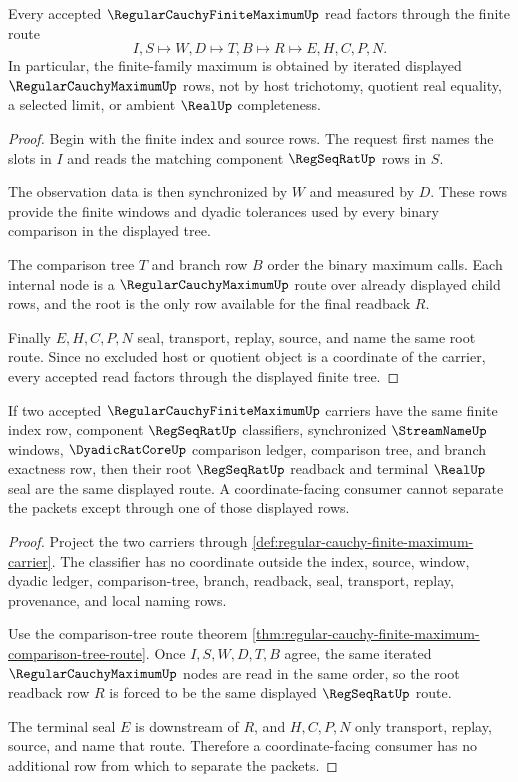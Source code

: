 \begin{theorem}
\label{thm:regular-cauchy-finite-maximum-comparison-tree-route}
Every accepted $\RegularCauchyFiniteMaximumUp$ read factors through the finite route
$$
I,S \longmapsto W,D \longmapsto T,B \longmapsto R \longmapsto E,H,C,P,N .
$$
In particular, the finite-family maximum is obtained by iterated displayed $\RegularCauchyMaximumUp$ rows, not by host trichotomy, quotient real equality, a selected limit, or ambient $\RealUp$ completeness.
\end{theorem}
\begin{proof}
Begin with the finite index and source rows. The request first names the slots in $I$ and reads the matching component $\RegSeqRatUp$ rows in $S$.

The observation data is then synchronized by $W$ and measured by $D$. These rows provide the finite windows and dyadic tolerances used by every binary comparison in the displayed tree.

The comparison tree $T$ and branch row $B$ order the binary maximum calls. Each internal node is a $\RegularCauchyMaximumUp$ route over already displayed child rows, and the root is the only row available for the final readback $R$.

Finally $E,H,C,P,N$ seal, transport, replay, source, and name the same root route. Since no excluded host or quotient object is a coordinate of the carrier, every accepted read factors through the displayed finite tree.
\end{proof}

\begin{theorem}
\label{thm:regular-cauchy-finite-maximum-coordinate-stability}
If two accepted $\RegularCauchyFiniteMaximumUp$ carriers have the same finite index row, component $\RegSeqRatUp$ classifiers, synchronized $\StreamNameUp$ windows, $\DyadicRatCoreUp$ comparison ledger, comparison tree, and branch exactness row, then their root $\RegSeqRatUp$ readback and terminal $\RealUp$ seal are the same displayed route. A coordinate-facing consumer cannot separate the packets except through one of those displayed rows.
\end{theorem}
\begin{proof}
Project the two carriers through \autoref{def:regular-cauchy-finite-maximum-carrier}. The classifier has no coordinate outside the index, source, window, dyadic ledger, comparison-tree, branch, readback, seal, transport, replay, provenance, and local naming rows.

Use the comparison-tree route theorem \autoref{thm:regular-cauchy-finite-maximum-comparison-tree-route}. Once $I,S,W,D,T,B$ agree, the same iterated $\RegularCauchyMaximumUp$ nodes are read in the same order, so the root readback row $R$ is forced to be the same displayed $\RegSeqRatUp$ route.

The terminal seal $E$ is downstream of $R$, and $H,C,P,N$ only transport, replay, source, and name that route. Therefore a coordinate-facing consumer has no additional row from which to separate the packets.
\end{proof}

